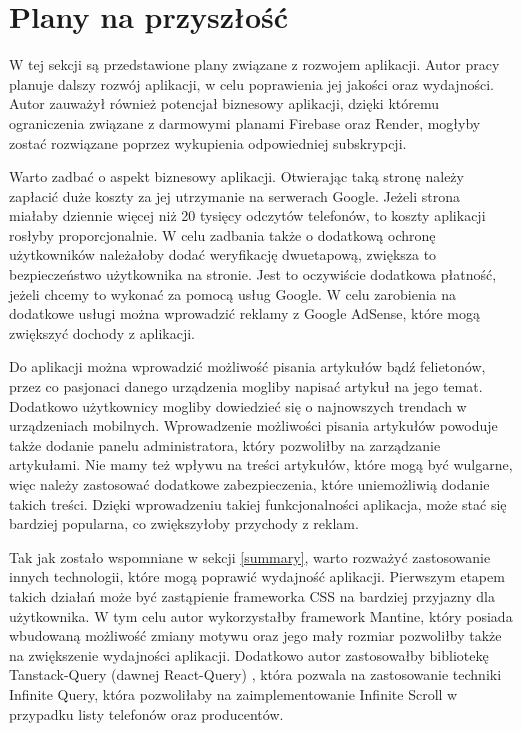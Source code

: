 \section{Plany na przyszłość}\label{future_plans}
W tej sekcji są przedstawione plany związane z rozwojem aplikacji. Autor pracy planuje dalszy rozwój aplikacji, w celu poprawienia jej jakości oraz wydajności. Autor  zauważył również potencjał biznesowy aplikacji, dzięki któremu ograniczenia związane z darmowymi planami Firebase oraz Render, mogłyby zostać rozwiązane poprzez wykupienia odpowiedniej subskrypcji.  

Warto zadbać o aspekt biznesowy aplikacji. Otwierając taką stronę należy zapłacić duże koszty za jej utrzymanie na serwerach Google. Jeżeli strona miałaby dziennie więcej niż 20 tysięcy odczytów telefonów, to koszty aplikacji rosłyby proporcjonalnie. W celu zadbania także o dodatkową ochronę użytkowników należałoby dodać weryfikację dwuetapową, zwiększa to bezpieczeństwo użytkownika na stronie. Jest to oczywiście dodatkowa płatność, jeżeli chcemy to wykonać za pomocą usług Google. W celu zarobienia na dodatkowe usługi można wprowadzić reklamy z Google AdSense, które mogą zwiększyć dochody z aplikacji.

Do aplikacji można wprowadzić możliwość pisania artykułów bądź felietonów, przez co pasjonaci danego urządzenia mogliby napisać artykuł na jego temat. Dodatkowo użytkownicy mogliby dowiedzieć się o najnowszych trendach w urządzeniach mobilnych. Wprowadzenie możliwości pisania artykułów powoduje także dodanie panelu administratora, który pozwoliłby na zarządzanie artykułami. Nie mamy też wpływu na treści artykułów, które mogą być wulgarne, więc należy zastosować dodatkowe zabezpieczenia, które uniemożliwią dodanie takich treści. Dzięki wprowadzeniu takiej funkcjonalności aplikacja, może stać się bardziej popularna, co zwiększyłoby przychody z reklam.

Tak jak zostało wspomniane w sekcji \ref{summary}, warto rozważyć zastosowanie innych technologii, które mogą poprawić wydajność aplikacji. Pierwszym etapem takich działań może być zastąpienie frameworka CSS na bardziej przyjazny dla użytkownika. W tym celu autor wykorzystałby framework Mantine, który posiada wbudowaną możliwość zmiany motywu oraz jego mały rozmiar pozwoliłby także na zwiększenie wydajności aplikacji. Dodatkowo autor zastosowałby bibliotekę Tanstack-Query (dawnej React-Query) \cite{tanstack_query}, która pozwala na zastosowanie techniki Infinite Query, która pozwoliłaby na zaimplementowanie Infinite Scroll \cite{infinite_scroll} w przypadku listy telefonów oraz producentów.

